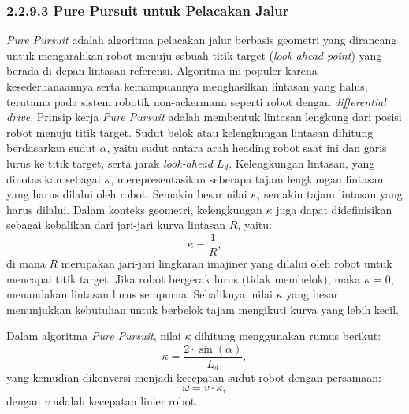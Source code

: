 \subsubsection{2.2.9.3 Pure Pursuit untuk Pelacakan Jalur}
\emph{Pure Pursuit} adalah algoritma pelacakan jalur berbasis geometri yang dirancang untuk mengarahkan robot menuju sebuah titik target (\emph{look-ahead point}) yang berada di depan lintasan referensi. Algoritma ini populer karena kesederhanaannya serta kemampuannya menghasilkan lintasan yang halus, terutama pada sistem robotik non-ackermann seperti robot dengan \emph{differential drive}.  Prinsip kerja \emph{Pure Pursuit} adalah membentuk lintasan lengkung dari posisi robot menuju titik target. Sudut belok atau kelengkungan lintasan dihitung berdasarkan sudut \( \alpha \), yaitu sudut antara arah heading robot saat ini dan garis lurus ke titik target, serta jarak \emph{look-ahead} \(L_d\).  Kelengkungan lintasan, yang dinotasikan sebagai \( \kappa \), merepresentasikan seberapa tajam lengkungan lintasan yang harus dilalui oleh robot. Semakin besar nilai \( \kappa \), semakin tajam lintasan yang harus dilalui. Dalam konteks geometri, kelengkungan \( \kappa \) juga dapat didefinisikan sebagai kebalikan dari jari-jari kurva lintasan \( R \), yaitu:
\begin{equation}
    \kappa = \frac{1}{R},
\end{equation}
di mana \( R \) merupakan jari-jari lingkaran imajiner yang dilalui oleh robot untuk mencapai titik target. Jika robot bergerak lurus (tidak membelok), maka \( \kappa = 0 \), menandakan lintasan lurus sempurna. Sebaliknya, nilai \( \kappa \) yang besar menunjukkan kebutuhan untuk berbelok tajam mengikuti kurva yang lebih kecil. 

Dalam algoritma \emph{Pure Pursuit}, nilai \( \kappa \) dihitung menggunakan rumus berikut:
\begin{equation}
    \kappa = \frac{2 \cdot \sin(\alpha)}{L_d},
\end{equation}
yang kemudian dikonversi menjadi kecepatan sudut robot dengan persamaan:
\begin{equation}
    \omega = v \cdot \kappa,
\end{equation}
dengan \( v \) adalah kecepatan linier robot.

